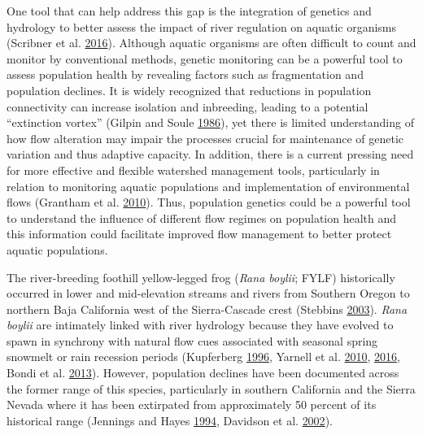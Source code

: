 \documentclass[twoside,12pt,final]{ucthesis-CA2012} %
\begin{document}
\begin{ucmainmatter}
One tool that can help address this gap is the integration of genetics
and hydrology to better assess the impact of river regulation on aquatic
organisms (Scribner et al.
\protect\hyperlink{ref-scribner_applications_2016}{2016}). Although
aquatic organisms are often difficult to count and monitor by
conventional methods, genetic monitoring can be a powerful tool to
assess population health by revealing factors such as fragmentation and
population declines. It is widely recognized that reductions in
population connectivity can increase isolation and inbreeding, leading
to a potential ``extinction vortex'' (Gilpin and Soule
\protect\hyperlink{ref-gilpin_minimum_1986}{1986}), yet there is limited
understanding of how flow alteration may impair the processes crucial
for maintenance of genetic variation and thus adaptive capacity. In
addition, there is a current pressing need for more effective and
flexible watershed management tools, particularly in relation to
monitoring aquatic populations and implementation of environmental flows
(Grantham et al. \protect\hyperlink{ref-grantham_climatic_2010}{2010}).
Thus, population genetics could be a powerful tool to understand the
influence of different flow regimes on population health and this
information could facilitate improved flow management to better protect
aquatic populations.

The river-breeding foothill yellow-legged frog (\emph{Rana boylii};
FYLF) historically occurred in lower and mid-elevation streams and
rivers from Southern Oregon to northern Baja California west of the
Sierra-Cascade crest (Stebbins
\protect\hyperlink{ref-stebbins_field_2003}{2003}). \emph{Rana boylii}
are intimately linked with river hydrology because they have evolved to
spawn in synchrony with natural flow cues associated with seasonal
spring snowmelt or rain recession periods (Kupferberg
\protect\hyperlink{ref-kupferberg_hydrologic_1996}{1996}, Yarnell et al.
\protect\hyperlink{ref-yarnell_ecology_2010}{2010},
\protect\hyperlink{ref-yarnell_management_2016}{2016}, Bondi et al.
\protect\hyperlink{ref-bondi_transferability_2013}{2013}). However,
population declines have been documented across the former range of this
species, particularly in southern California and the Sierra Nevada where
it has been extirpated from approximately 50 percent of its historical
range (Jennings and Hayes
\protect\hyperlink{ref-jennings_amphibian_1994}{1994}, Davidson et al.
\protect\hyperlink{ref-davidson_spatial_2002}{2002}).

\par


\end{ucmainmatter}
\end{document}
